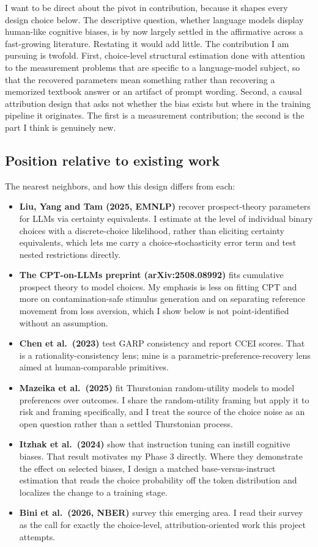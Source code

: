 \documentclass[11pt]{article}
\begin{document}
I want to be direct about the pivot in contribution, because it shapes every design choice below.
The descriptive question, whether language models display human-like cognitive biases, is by now
largely settled in the affirmative across a fast-growing literature. Restating it would add little.
The contribution I am pursuing is twofold. First, choice-level structural estimation done with
attention to the measurement problems that are specific to a language-model subject, so that the
recovered parameters mean something rather than recovering a memorized textbook answer or an
artifact of prompt wording. Second, a causal attribution design that asks not whether the bias
exists but where in the training pipeline it originates. The first is a measurement contribution;
the second is the part I think is genuinely new.

\subsection{Position relative to existing work}

The nearest neighbors, and how this design differs from each:

\begin{itemize}[leftmargin=1.4em]
\item \textbf{Liu, Yang and Tam (2025, EMNLP)} recover prospect-theory parameters for LLMs via
certainty equivalents. I estimate at the level of individual binary choices with a discrete-choice
likelihood, rather than eliciting certainty equivalents, which lets me carry a choice-stochasticity
error term and test nested restrictions directly.
\item \textbf{The CPT-on-LLMs preprint (arXiv:2508.08992)} fits cumulative prospect theory to model
choices. My emphasis is less on fitting CPT and more on contamination-safe stimulus generation and
on separating reference movement from loss aversion, which I show below is not point-identified
without an assumption.
\item \textbf{Chen et al.\ (2023)} test GARP consistency and report CCEI scores. That is a
rationality-consistency lens; mine is a parametric-preference-recovery lens aimed at
human-comparable primitives.
\item \textbf{Mazeika et al.\ (2025)} fit Thurstonian random-utility models to model preferences
over outcomes. I share the random-utility framing but apply it to risk and framing specifically,
and I treat the source of the choice noise as an open question rather than a settled Thurstonian
process.
\item \textbf{Itzhak et al.\ (2024)} show that instruction tuning can instill cognitive biases.
That result motivates my Phase 3 directly. Where they demonstrate the effect on selected biases, I
design a matched base-versus-instruct estimation that reads the choice probability off the token
distribution and localizes the change to a training stage.
\item \textbf{Bini et al.\ (2026, NBER)} survey this emerging area. I read their survey as the
call for exactly the choice-level, attribution-oriented work this project attempts.
\end{itemize}
\end{document}
